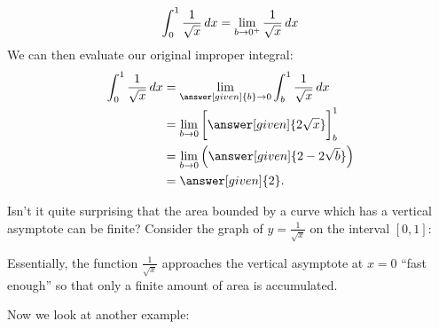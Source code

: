 \documentclass{ximera}
\begin{document}
\begin{example}
\begin{explanation}
\[
\int_{0}^{1} \frac{1}{\sqrt{x}} \mathop{}\!d x=\lim_{b \to 0^{+}} \frac{1}{\sqrt{x}} \mathop{}\!d x
\]
We can then evaluate our original improper integral:
    \begin{align*}
      \int_{0}^1 \frac{1}{\sqrt{x}} \d x &= \lim_{\answer[given]{b} \to 0} \int_{b}^1 \frac{1}{\sqrt{x}} \d x \\
      &=  \lim_{b \to 0}  \eval{\answer[given]{2\sqrt{x}}}_b^1 \\
      &=  \lim_{b \to 0} \left(\answer[given]{2-2\sqrt{b}}\right)\\
      &= \answer[given]{2}.
    \end{align*}

Isn't it quite surprising that the area bounded by a curve which has a
vertical asymptote can be finite? Consider the graph of $y=
\frac{1}{\sqrt{x}}$ on the interval $[0,1]$:

\begin{image}
\end{image}

Essentially, the function $\frac{1}{\sqrt{x}}$ approaches the vertical asymptote at $x=0$ ``fast enough'' so that only a finite amount of area is accumulated.

  \end{explanation}
\end{example}

Now we look at another example:
\end{document}
